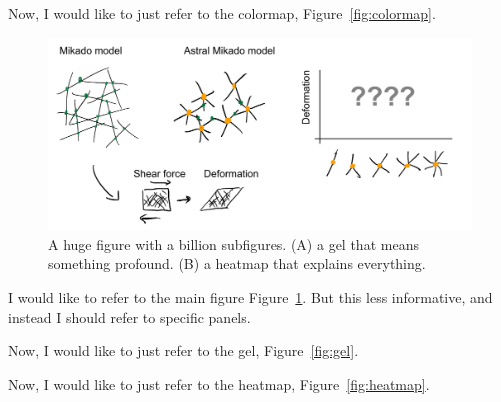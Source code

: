 \documentclass[onecolumn,11pt]{article}
\begin{document}
Now, I would like to just refer to the colormap, Figure~\ref{fig:colormap}.



\clearpage




\begin{figure}[ht]
        \centering
        \includegraphics[width=4.5in]{figures/figJeanJacket.pdf}


        \caption{A huge figure with a billion subfigures. 
        (A) a gel that means something profound. 
        (B) a heatmap that explains everything.}
        \label{fig:main_conclusion}
\end{figure}
    

I would like to refer to the main figure Figure~\ref{fig:main_conclusion}. But this less informative, and instead I should refer to specific panels.

Now, I would like to just refer to the gel, Figure~\ref{fig:gel}.

Now, I would like to just refer to the heatmap, Figure~\ref{fig:heatmap}.







\end{document}
